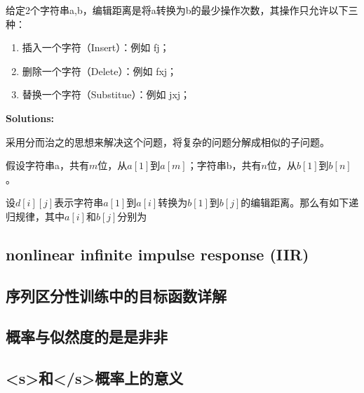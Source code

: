 给定2个字符串a,b，编辑距离是将a转换为b的最少操作次数，其操作只允许以下三种：
\begin{enumerate}
	\item 插入一个字符（Insert）：例如 fj；
	\item 删除一个字符（Delete）：例如 fxj；
	\item 替换一个字符（Substitue）：例如 jxj；
\end{enumerate}

{\bf Solutions:}

采用分而治之的思想来解决这个问题，将复杂的问题分解成相似的子问题。

假设字符串a，共有$m$位，从$a[1]$到$a[m]$；字符串b，共有$n$位，从$b[1]$到$b[n]$。

设$d[i][j]$表示字符串$a[1]$到$a[i]$转换为$b[1]$到$b[j]$的编辑距离。那么有如下递归规律，其中$a[i]$和$b[j]$分别为

\subsection{nonlinear infinite impulse response (IIR)}

\subsection{序列区分性训练中的目标函数详解}
\label{sub:sdt-obj}


\subsection{概率与似然度的是是非非}

\subsection{<s>和</s>概率上的意义}
\label{sub:start-end}















